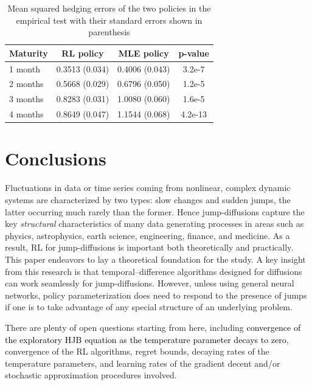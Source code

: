 \documentclass[11pt]{article}
\newcommand{\1}{\mathbbm{1}}
\newcommand{\rev}[1]{\textcolor{black}{{#1}}} %
\begin{document}
\begin{table}[htbp!]
	\centering
	\begin{tabular}{lccc}
		\hline
		Maturity & RL policy & MLE policy & p-value \\ \hline
		1 month & 0.3513 (0.034) & 0.4006 (0.043) & 3.2e-7 \\
		2 months & 0.5668 (0.029) & 0.6796 (0.050) & 1.2e-5 \\
		3 months & 0.8283 (0.031) & 1.0080 (0.060) & 1.6e-5 \\
		4 months & 0.8649 (0.047) & 1.1544 (0.068) & 4.2e-13 \\ \hline
	\end{tabular}
	\caption{Mean squared hedging errors of the two policies in the empirical test with their standard errors shown in parenthesis}\label{tab:hedge-test-perf}
\end{table}



\section{Conclusions} \label{sec:conclusion}

Fluctuations in data or time series coming from nonlinear, complex dynamic systems are characterized by two types: slow changes and sudden jumps, the latter occurring much rarely than the former. Hence jump-diffusions capture the key {\it structural}  characteristics of many data generating processes in areas such as physics, astrophysics, earth science,
engineering, finance, and medicine. As a result, RL for jump-diffusions is important both theoretically and practically. This paper endeavors to lay a theoretical foundation for the study. A key insight from this research is that temporal--difference algorithms designed for diffusions can work seamlessly for jump-diffusions. However,
unless using general neural networks, policy parameterization does need to respond to the presence of jumps if one is to take advantage of any special structure of an underlying problem.

There are plenty of open questions starting from here, including \rev{convergence of the exploratory HJB equation as the temperature parameter decays to zero}, convergence of the RL algorithms, regret bounds, decaying rates of the temperature parameters, and learning rates of the gradient decent and/or stochastic approximation procedures involved.
\end{document}
